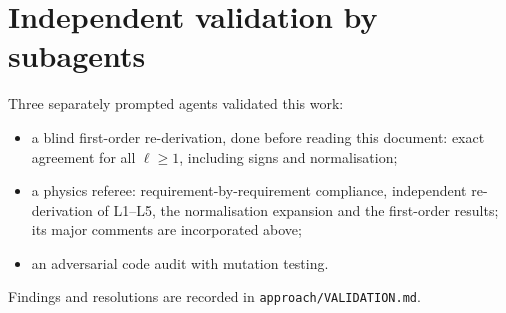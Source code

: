 \documentclass[11pt]{article}
\theoremstyle{definition}
\theoremstyle{remark}
\begin{document}
\section{Independent validation by subagents}\label{sec:indep}
Three separately prompted agents validated this work:
\begin{itemize}
\item a blind first-order re-derivation, done before reading this document:
exact agreement for all $\ell\ge1$, including signs and normalisation;
\item a physics referee: requirement-by-requirement compliance, independent
re-derivation of L1--L5, the normalisation expansion and the first-order
results; its major comments are incorporated above;
\item an adversarial code audit with mutation testing.
\end{itemize}
Findings and resolutions are recorded in \texttt{approach/VALIDATION.md}.
\end{document}

